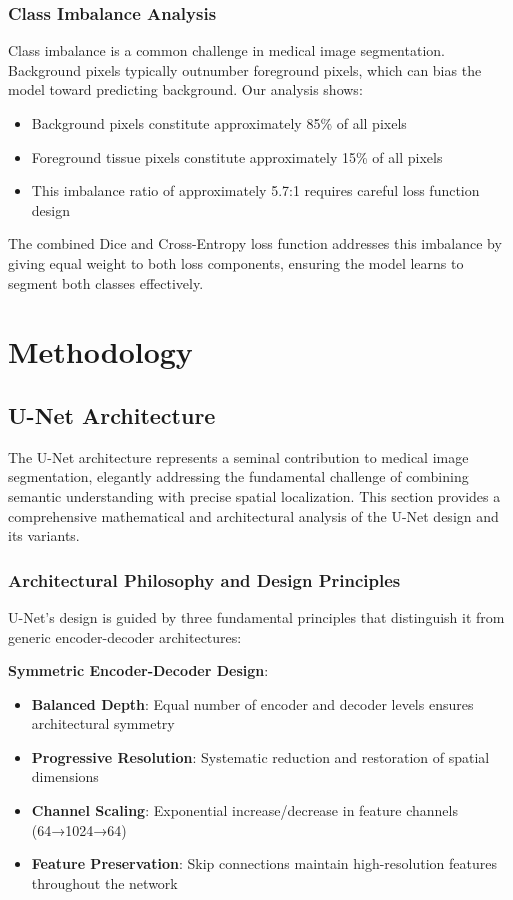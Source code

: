 \documentclass[12pt,a4paper]{article}
\begin{document}
\subsubsection{Class Imbalance Analysis}

Class imbalance is a common challenge in medical image segmentation. Background pixels typically outnumber foreground pixels, which can bias the model toward predicting background. Our analysis shows:

\begin{itemize}
    \item Background pixels constitute approximately 85\% of all pixels
    \item Foreground tissue pixels constitute approximately 15\% of all pixels
    \item This imbalance ratio of approximately 5.7:1 requires careful loss function design
\end{itemize}

The combined Dice and Cross-Entropy loss function addresses this imbalance by giving equal weight to both loss components, ensuring the model learns to segment both classes effectively.

\section{Methodology}

\subsection{U-Net Architecture}

The U-Net architecture represents a seminal contribution to medical image segmentation, elegantly addressing the fundamental challenge of combining semantic understanding with precise spatial localization. This section provides a comprehensive mathematical and architectural analysis of the U-Net design and its variants.

\subsubsection{Architectural Philosophy and Design Principles}

U-Net's design is guided by three fundamental principles that distinguish it from generic encoder-decoder architectures:

\textbf{Symmetric Encoder-Decoder Design}:
\begin{itemize}
    \item \textbf{Balanced Depth}: Equal number of encoder and decoder levels ensures architectural symmetry
    \item \textbf{Progressive Resolution}: Systematic reduction and restoration of spatial dimensions
    \item \textbf{Channel Scaling}: Exponential increase/decrease in feature channels (64→1024→64)
    \item \textbf{Feature Preservation}: Skip connections maintain high-resolution features throughout the network
\end{itemize}
\end{document}
